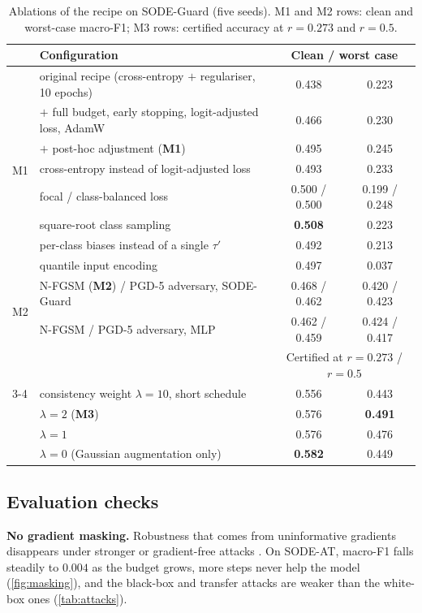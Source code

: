 \begin{table}[t]
\caption{Ablations of the recipe on SODE-Guard (five seeds). M1 and M2 rows:
clean and worst-case macro-F1; M3 rows: certified accuracy at $r=0.273$ and
$r=0.5$.}
\label{tab:ablation}
\centering\footnotesize
\setlength{\tabcolsep}{5pt}
\begin{tabular}{llcc}
\toprule
& Configuration & \multicolumn{2}{c}{Clean / worst case}\\
\midrule
\multirow{8}{*}{M1}
& original recipe (cross-entropy $+$ regulariser, 10 epochs) & 0.438 & 0.223\\
& $+$ full budget, early stopping, logit-adjusted loss, AdamW & 0.466 & 0.230\\
& $+$ post-hoc adjustment (\textbf{M1}) & 0.495 & 0.245\\
& \quad cross-entropy instead of logit-adjusted loss & 0.493 & 0.233\\
& \quad focal / class-balanced loss & 0.500 / 0.500 & 0.199 / 0.248\\
& \quad square-root class sampling & \textbf{0.508} & 0.223\\
& \quad per-class biases instead of a single $\tau'$ & 0.492 & 0.213\\
& \quad quantile input encoding & 0.497 & 0.037\\
\midrule
\multirow{2}{*}{M2}
& N-FGSM (\textbf{M2}) / PGD-5 adversary, SODE-Guard & 0.468 / 0.462 & 0.420 / 0.423\\
& N-FGSM / PGD-5 adversary, MLP & 0.462 / 0.459 & 0.424 / 0.417\\
\midrule
& & \multicolumn{2}{c}{Certified at $r=0.273$ / $r=0.5$}\\
\cmidrule(lr){3-4}
\multirow{4}{*}{M3}
& consistency weight $\lambda=10$, short schedule & 0.556 & 0.443\\
& $\lambda=2$ (\textbf{M3}) & 0.576 & \textbf{0.491}\\
& $\lambda=1$ & 0.576 & 0.476\\
& $\lambda=0$ (Gaussian augmentation only) & \textbf{0.582} & 0.449\\
\bottomrule
\end{tabular}
\end{table}

\subsection{Evaluation checks}
\textbf{No gradient masking.} Robustness that comes from uninformative gradients
disappears under stronger or gradient-free attacks
\citep{athalye2018obfuscated,carlini2019evaluating}. On SODE-AT, macro-F1 falls
steadily to $0.004$ as the budget grows, more steps never help the model
(\cref{fig:masking}), and the black-box and transfer attacks are weaker than
the white-box ones (\cref{tab:attacks}).

